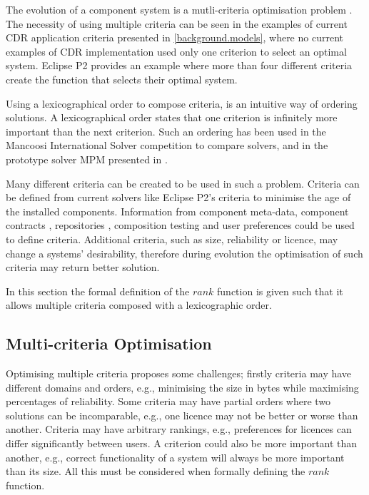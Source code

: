 The evolution of a component system is a mutli-criteria optimisation problem \citep{Berre2008}.
The necessity of using multiple criteria can be seen in the examples of current CDR application criteria presented in \ref{background.models},
where no current examples of CDR implementation used only one criterion to select an optimal system.
Eclipse P2 provides an example where more than four different criteria create the function that selects their optimal system.

Using a lexicographical order to compose criteria, is an intuitive way of ordering solutions.
A lexicographical order states that one criterion is infinitely more important than the next criterion.
Such an ordering has been used in the Mancoosi International Solver competition to compare solvers, and in the prototype solver MPM presented in \cite{abate2011}.

Many different criteria can be created to be used in such a problem.
Criteria can be defined from current solvers like Eclipse P2's criteria to minimise the age of the installed components.
Information from component meta-data, component contracts \citep{Watkins1999}, repositories \citep{Guo2000}, 
composition testing \cite{XuejieZhang2008} and user preferences could be used to define criteria.
Additional criteria, such as size, reliability or licence, may change a systems' desirability, 
therefore during evolution the optimisation of such criteria may return better solution.

In this section the formal definition of the $rank$ function is given such that it allows multiple criteria composed with a lexicographic order.

\subsection{Multi-criteria Optimisation}
Optimising multiple criteria proposes some challenges; firstly criteria may have different domains and orders, 
e.g., minimising the size in bytes while maximising percentages of reliability. 
Some criteria may have partial orders where two solutions can be incomparable,
e.g., one licence may not be better or worse than another.
Criteria may have arbitrary rankings, 
e.g., preferences for licences can differ significantly between users.
A criterion could also be more important than another, 
e.g., correct functionality of a system will always be more important than its size.
All this must be considered when formally defining the $rank$ function.

